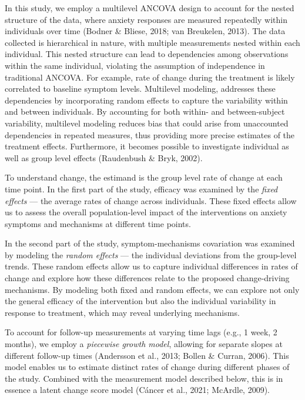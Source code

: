 \documentclass[
  man,floatsintext]{apa7}
\begin{document}
In this study, we employ a multilevel ANCOVA design to account for the nested structure of the data, where anxiety responses are measured repeatedly within individuals over time (Bodner \& Bliese, 2018; van Breukelen, 2013).
The data collected is hierarchical in nature, with multiple measurements nested within each individual.
This nested structure can lead to dependencies among observations within the same individual, violating the assumption of independence in traditional ANCOVA.
For example, rate of change during the treatment is likely correlated to baseline symptom levels.
Multilevel modeling, addresses these dependencies by incorporating random effects to capture the variability within and between individuals.
By accounting for both within- and between-subject variability, multilevel modeling reduces bias that could arise from unaccounted dependencies in repeated measures, thus providing more precise estimates of the treatment effects.
Furthermore, it becomes possible to investigate individual as well as group level effects (Raudenbush \& Bryk, 2002).

To understand change, the estimand is the group level rate of change at each time point.
In the first part of the study, efficacy was examined by the \emph{fixed effects} --- the average rates of change across individuals.
These fixed effects allow us to assess the overall population-level impact of the interventions on anxiety symptoms and mechanisms at different time points.

In the second part of the study, symptom-mechanisms covariation was examined by modeling the \emph{random effects} --- the individual deviations from the group-level trends.
These random effects allow us to capture individual differences in rates of change and explore how these differences relate to the proposed change-driving mechanisms.
By modeling both fixed and random effects, we can explore not only the general efficacy of the intervention but also the individual variability in response to treatment, which may reveal underlying mechanisms.

To account for follow-up measurements at varying time lags (e.g., 1 week, 2 months), we employ a \emph{piecewise growth model}, allowing for separate slopes at different follow-up times (Andersson et al., 2013; Bollen \& Curran, 2006).
This model enables us to estimate distinct rates of change during different phases of the study.
Combined with the measurement model described below, this is in essence a latent change score model (Cáncer et al., 2021; McArdle, 2009).
\end{document}
